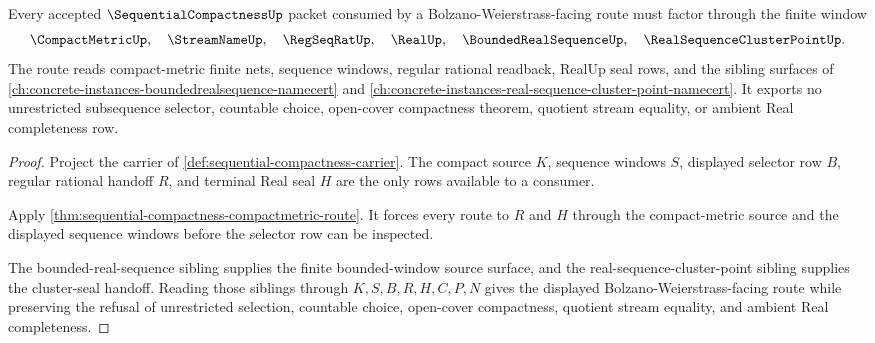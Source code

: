 \begin{theorem}
\label{thm:sequential-compactness-bolzano-weierstrass-window}
Every accepted $\SequentialCompactnessUp$ packet consumed by a Bolzano-Weierstrass-facing route must factor through the finite window
$$
\CompactMetricUp,\quad \StreamNameUp,\quad \RegSeqRatUp,\quad \RealUp,\quad \BoundedRealSequenceUp,\quad \RealSequenceClusterPointUp .
$$
The route reads compact-metric finite nets, sequence windows, regular rational readback, RealUp seal rows, and the sibling surfaces of \autoref{ch:concrete-instances-boundedrealsequence-namecert} and \autoref{ch:concrete-instances-real-sequence-cluster-point-namecert}. It exports no unrestricted subsequence selector, countable choice, open-cover compactness theorem, quotient stream equality, or ambient Real completeness row.
\end{theorem}
\begin{proof}
Project the carrier of \autoref{def:sequential-compactness-carrier}. The compact source $K$, sequence windows $S$, displayed selector row $B$, regular rational handoff $R$, and terminal Real seal $H$ are the only rows available to a consumer.

Apply \autoref{thm:sequential-compactness-compactmetric-route}. It forces every route to $R$ and $H$ through the compact-metric source and the displayed sequence windows before the selector row can be inspected.

The bounded-real-sequence sibling supplies the finite bounded-window source surface, and the real-sequence-cluster-point sibling supplies the cluster-seal handoff. Reading those siblings through $K,S,B,R,H,C,P,N$ gives the displayed Bolzano-Weierstrass-facing route while preserving the refusal of unrestricted selection, countable choice, open-cover compactness, quotient stream equality, and ambient Real completeness.
\end{proof}

